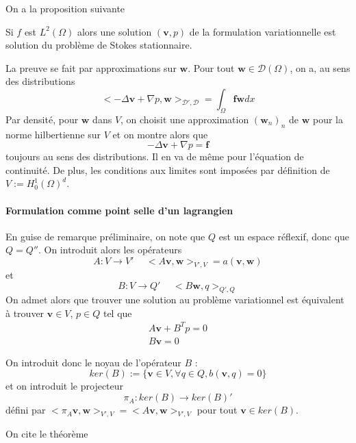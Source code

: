 On a la proposition suivante
\begin{proposition}
    Si $f$ est $L^2(\Omega)$ alors une solution $(\mathbf{v}, p)$ de la formulation variationnelle est solution du problème de Stokes stationnaire.
\end{proposition}

La preuve se fait par approximations sur $\mathbf{w}$. Pour tout $\mathbf{w} \in \mathcal{D}(\Omega)$, on a, au sens des distributions $$ < - \Delta \mathbf{v} + \nabla p, \mathbf{w} >_{\mathcal{D}', \mathcal{D}} = \int_\Omega \mathbf{f} \mathbf{w} dx $$ Par densité, pour $\mathbf{w}$ dans $V$, on choisit une approximation $\left(\mathbf{w}_n\right)_n$ de $\mathbf{w}$ pour la norme hilbertienne sur $V$ et on montre alors que $$ - \Delta \mathbf{v} + \nabla p = \mathbf{f} $$ toujours au sens des distributions. Il en va de même pour l'équation de continuité. De plus, les conditions aux limites sont imposées par définition de $V := H^1_0(\Omega)^d$. 

\paragraph{Formulation comme point selle d'un lagrangien} En guise de remarque préliminaire, on note que $Q$ est un espace réflexif, donc que $Q = Q''$. On introduit alors les opérateurs $$ A : V \rightarrow V' \hspace{15pt} <A\mathbf{v}, \mathbf{w}>_{V', V} = a(\mathbf{v}, \mathbf{w}) $$ et $$ B : V \rightarrow Q' \hspace{15pt} <B\mathbf{w}, q>_{Q', Q} $$ On admet alors que trouver une solution au problème variationnel est équivalent à
trouver $\mathbf{v} \in V$, $p \in Q$ tel que
\begin{align*}
    A\mathbf{v} + B^T p = 0 \\
    B\mathbf{v} = 0
\end{align*}

On introduit donc le noyau de l'opérateur $B$ : $$ ker(B) := \{ \mathbf{v} \in V, \forall q \in Q, b(\mathbf{v}, q) = 0 \} $$ et on introduit le projecteur $$ \pi_A : ker(B) \rightarrow ker(B)' $$ défini par $ < \pi_A \mathbf{v}, \mathbf{w}>_{V', V} = < A\mathbf{v}, \mathbf{w} >_{V', V} $ pour tout $\mathbf{v} \in ker(B)$.

On cite le théorème

